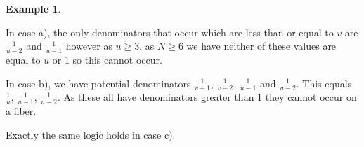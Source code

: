 \documentclass[12pt,a4paper]{book}      %
\theoremstyle{definition}
\newtheorem{ex}[thm]{Example}
\begin{document}
\begin{ex}
\begin{itemize}
In case a), the only denominators that occur which are less than or equal to $v$ are $\frac{1}{u-2}$ and $\frac{1}{u-1}$ however as $u \geq 3$, as $N \geq 6$ we have neither of these values are equal to $u$ or $1$ so this cannot occur.

In case b), we have potential denominators $\frac{1}{v-1}$, $\frac{1}{v-2}$, $\frac{1}{u-1}$ and $\frac{1}{u-2}$. This equals $\frac{1}{u}$, $\frac{1}{u-1}$, $\frac{1}{u-2}$. As these all have denominators greater than 1 they cannot occur on a fiber. 

Exactly the same logic holds in case c).


\end{itemize}
\end{ex}








\end{document}
